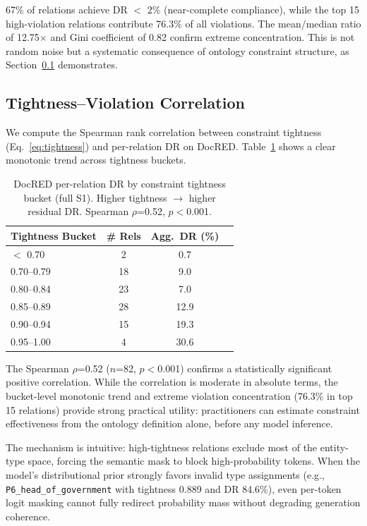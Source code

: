 \documentclass[11pt,a4paper]{article}
\begin{document}
67\% of relations achieve DR $<$ 2\% (near-complete compliance), while the top 15 high-violation relations contribute 76.3\% of all violations.
The mean/median ratio of 12.75$\times$ and Gini coefficient of 0.82 confirm extreme concentration.
This is not random noise but a systematic consequence of ontology constraint structure, as Section~\ref{sec:tightness} demonstrates.

\subsection{Tightness--Violation Correlation}
\label{sec:tightness}

We compute the Spearman rank correlation between constraint tightness (Eq.~\ref{eq:tightness}) and per-relation DR on DocRED.
Table~\ref{tab:tightness} shows a clear monotonic trend across tightness buckets.

\begin{table}[t]
\centering
\small
\caption{DocRED per-relation DR by constraint tightness bucket (full S1). Higher tightness $\to$ higher residual DR. Spearman $\rho$=0.52, $p<$0.001.}
\label{tab:tightness}
\begin{tabular}{lccc}
\toprule
\textbf{Tightness Bucket} & \textbf{\# Rels} & \textbf{Agg.\ DR (\%)} \\
\midrule
$<$ 0.70          & 2  & 0.7 \\
0.70--0.79        & 18 & 9.0 \\
0.80--0.84        & 23 & 7.0 \\
0.85--0.89        & 28 & 12.9 \\
0.90--0.94        & 15 & 19.3 \\
0.95--1.00        & 4  & 30.6 \\
\bottomrule
\end{tabular}
\end{table}

The Spearman $\rho$=0.52 ($n$=82, $p<$0.001) confirms a statistically significant positive correlation.
While the correlation is moderate in absolute terms, the bucket-level monotonic trend and extreme violation concentration (76.3\% in top 15 relations) provide strong practical utility: practitioners can estimate constraint effectiveness from the ontology definition alone, before any model inference.

The mechanism is intuitive: high-tightness relations exclude most of the entity-type space, forcing the semantic mask to block high-probability tokens.
When the model's distributional prior strongly favors invalid type assignments (e.g., \texttt{P6\_head\_of\_government} with tightness 0.889 and DR 84.6\%), even per-token logit masking cannot fully redirect probability mass without degrading generation coherence.
\end{document}
